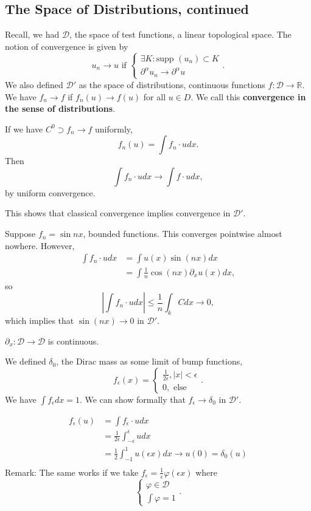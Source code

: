 \documentclass[11pt]{scrartcl}
\newcommand{\R}{\mathbb{R}}
\let \phi \varphi
\newcommand{\supp}{\text{supp }}
\begin{document}
\subsection{The Space of Distributions, continued}
Recall, we had $\mathcal D$, the space of test functions, a linear topological space.  The notion of convergence is given by 
$$u_n \rightarrow u \text{ if } \begin{cases} \exists K : \supp(u_n) \subset K\\
\partial^\alpha u_n \rightarrow \partial^\alpha u
\end{cases}.$$
We also defined $\mathcal D'$ as the space of distributions, continuous functions $f: \mathcal D \rightarrow \R$.  We have $f_n \rightarrow f$ if $f_n(u) \rightarrow f(u)$ for all $u \in D$. We call this \textbf{convergence in the sense of distributions}.
\begin{example} If we have $C^0 \supset f_n \rightarrow f$ uniformly,
$$f_n(u) = \int f_n \cdot u dx.$$
Then
$$\int f_n \cdot u dx \rightarrow \int f \cdot u dx,$$
by uniform convergence.

This shows that classical convergence implies convergence in $\mathcal D'$.
\end{example}
 \begin{example} Suppose $f_n = \sin{nx}$, bounded functions.  This converges pointwise almost nowhere.  However,
\begin{align*}
\int f_n \cdot u dx &=\int u(x)\sin{(nx)}dx\\
&= \int \frac{1}{n}\cos{(nx)} \partial_x u(x)dx,
\end{align*}
so
$$\left |\int f_n\cdot u dx \right| \le \frac{1}{n} \int_k Cdx \rightarrow 0,$$
which implies that $\sin (nx) \rightarrow 0$ in $\mathcal D'$.
 \end{example}
 \begin{proposition} $\partial_x : \mathcal D \rightarrow \mathcal D$ is continuous.
 \end{proposition}
 \begin{example} We defined $\delta_0$, the Dirac mass as some limit of bump functions, $$f_\epsilon(x) = \begin{cases}
 \frac{1}{2\epsilon}, |x| < \epsilon \\
 0, \text{ else}
 \end{cases}.$$
 We have $\int f_\epsilon dx = 1$.  We can show formally that $f_\epsilon \rightarrow \delta_0$ in $\mathcal D'$.
 
\begin{align*}
f_\epsilon(u) &= \int f_\epsilon\cdot u dx\\
&= \frac{1}{2\epsilon} \int_{-\epsilon}^\epsilon u dx\\
&= \frac{1}{2}\int_{-1}^1 u(\epsilon x)dx \rightarrow u(0) = \delta_0(u)\\
\end{align*}
Remark:  The same works if we take $f_\epsilon =\frac{1}{\epsilon}\phi(\epsilon x)$ where 
$$\begin{cases}
\phi \in \mathcal D\\
\int \phi = 1
\end{cases}.$$
\end{example}
\end{document}
